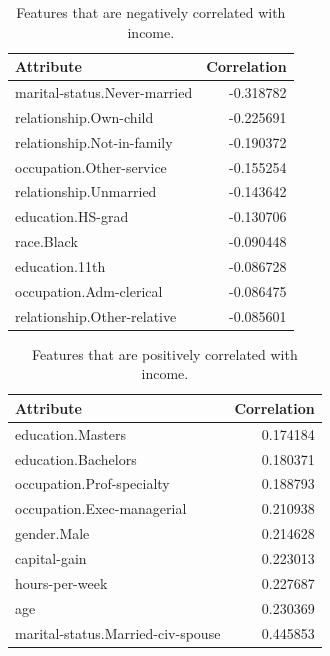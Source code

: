 \begin{table}
    \centering
    \begin{tabular}{lr}
        \toprule
        Attribute &  Correlation \\
        \midrule
        marital-status.Never-married &    -0.318782 \\
        relationship.Own-child       &    -0.225691 \\
        relationship.Not-in-family   &    -0.190372 \\
        occupation.Other-service     &    -0.155254 \\
        relationship.Unmarried       &    -0.143642 \\
        education.HS-grad            &    -0.130706 \\
        race.Black                   &    -0.090448 \\
        education.11th               &    -0.086728 \\
        occupation.Adm-clerical      &    -0.086475 \\
        relationship.Other-relative  &    -0.085601 \\
        \bottomrule
    \end{tabular}
    \caption{Features that are negatively correlated with income.}
    \label{fig:negative_income_correaltion}
\end{table}

\begin{table}
    \centering
    \begin{tabular}{lr}
        \toprule
        Attribute &  Correlation \\
        \midrule
        education.Masters                 &     0.174184 \\
        education.Bachelors               &     0.180371 \\
        occupation.Prof-specialty         &     0.188793 \\
        occupation.Exec-managerial        &     0.210938 \\
        gender.Male                       &     0.214628 \\
        capital-gain                      &     0.223013 \\
        hours-per-week                    &     0.227687 \\
        age                               &     0.230369 \\
        marital-status.Married-civ-spouse &     0.445853 \\
        \bottomrule
    \end{tabular}
    \caption{Features that are positively correlated with income.}
    \label{fig:positive_income_correaltion}
\end{table}

